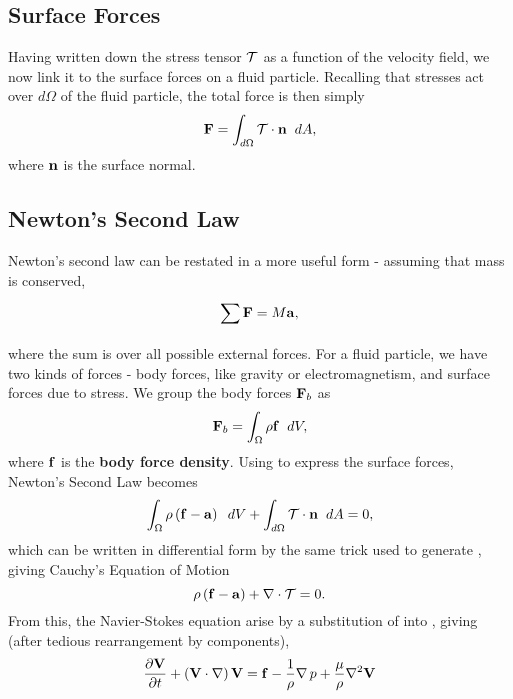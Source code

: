\subsection{Surface Forces}
Having written down the stress tensor $\mathcal{T}$ as a function of the velocity field, we now link it to the surface forces on a fluid particle. Recalling that stresses act over $d\Omega$ of the fluid particle, the total force is then simply 
\begin{equation}\label{eq:surfaceForce}
\Vector{F} = \int{d\Omega}{}{\Tensor{T}\cdot\Vector{n}}{dA},
\end{equation}
where $\mathbf{n}$ is the surface normal. 
\subsection{Newton's Second Law}
Newton's second law can be restated in a more useful form - assuming that mass is conserved,
\begin{equation}
\sum{}{}{\Vector{F}} = M\Vector{a},
\end{equation}
where the sum is over all possible external forces. For a fluid particle, we have two kinds of forces - body forces, like gravity or electromagnetism, and surface forces due to stress. We group the body forces $\mathbf{F}_b$ as \begin{equation}
\Vector{F}_b = \int{\Omega}{}{\rho\Vector{f}}{dV},
\end{equation}
where $\mathbf{f}$ is the {\bf body force density}. Using  to express the surface forces, Newton's Second Law becomes
\begin{equation}
\int{\Omega}{}{\rho\paren{\Vector{f}-\Vector{a}}}{dV} + \int{d\Omega}{}{\Tensor{T}\cdot\Vector{n}}{dA} = 0,
\end{equation}
which can be written in differential form by the same trick used to generate , giving Cauchy's Equation of Motion
\begin{equation}\label{eq:CauchyEOM}
\rho\left ( \mathbf{f}-\mathbf{a} \right ) + \nabla\cdot\mathcal{T} = 0.
\end{equation}
From this, the Navier-Stokes equation arise by a substitution of  into , giving (after tedious rearrangement by components),
\begin{equation}\label{eq:NS}
\pder{1}{\Vector{V}}{t} + \paren{\Vector{V}\cdot\nabla}\Vector{V} = \Vector{f} - \frac{1}{\rho}\Grad{p} + \frac{\mu}{\rho}\nabla^2\Vector{V}
\end{equation}

